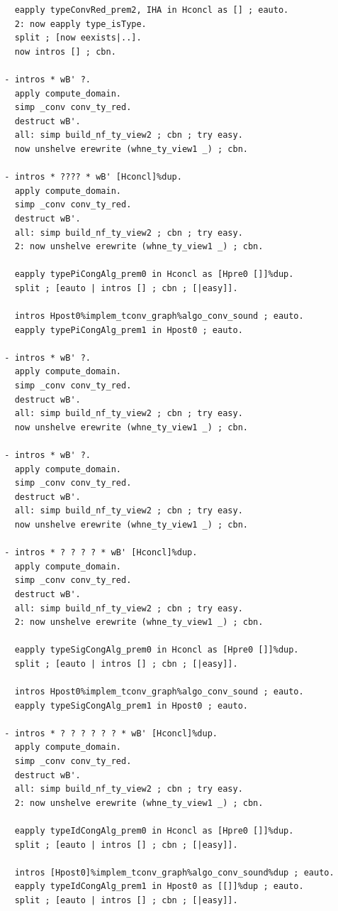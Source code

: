 \documentclass[10pt,a4paper]{amsart}
\begin{document}
\begin{lstlisting}
    eapply typeConvRed_prem2, IHA in Hconcl as [] ; eauto.
    2: now eapply type_isType.
    split ; [now eexists|..].
    now intros [] ; cbn.

  - intros * wB' ?.
    apply compute_domain.
    simp _conv conv_ty_red.
    destruct wB'.
    all: simp build_nf_ty_view2 ; cbn ; try easy.
    now unshelve erewrite (whne_ty_view1 _) ; cbn.

  - intros * ???? * wB' [Hconcl]%dup.
    apply compute_domain.
    simp _conv conv_ty_red.
    destruct wB'.
    all: simp build_nf_ty_view2 ; cbn ; try easy.
    2: now unshelve erewrite (whne_ty_view1 _) ; cbn.
    
    eapply typePiCongAlg_prem0 in Hconcl as [Hpre0 []]%dup.
    split ; [eauto | intros [] ; cbn ; [|easy]].

    intros Hpost0%implem_tconv_graph%algo_conv_sound ; eauto.
    eapply typePiCongAlg_prem1 in Hpost0 ; eauto.

  - intros * wB' ?.
    apply compute_domain.
    simp _conv conv_ty_red.
    destruct wB'.
    all: simp build_nf_ty_view2 ; cbn ; try easy.
    now unshelve erewrite (whne_ty_view1 _) ; cbn.
  
  - intros * wB' ?.
    apply compute_domain.
    simp _conv conv_ty_red.
    destruct wB'.
    all: simp build_nf_ty_view2 ; cbn ; try easy.
    now unshelve erewrite (whne_ty_view1 _) ; cbn.

  - intros * ? ? ? ? * wB' [Hconcl]%dup.
    apply compute_domain.
    simp _conv conv_ty_red.
    destruct wB'.
    all: simp build_nf_ty_view2 ; cbn ; try easy.
    2: now unshelve erewrite (whne_ty_view1 _) ; cbn.
    
    eapply typeSigCongAlg_prem0 in Hconcl as [Hpre0 []]%dup.
    split ; [eauto | intros [] ; cbn ; [|easy]].

    intros Hpost0%implem_tconv_graph%algo_conv_sound ; eauto.
    eapply typeSigCongAlg_prem1 in Hpost0 ; eauto.

  - intros * ? ? ? ? ? ? * wB' [Hconcl]%dup.
    apply compute_domain.
    simp _conv conv_ty_red.
    destruct wB'.
    all: simp build_nf_ty_view2 ; cbn ; try easy.
    2: now unshelve erewrite (whne_ty_view1 _) ; cbn.

    eapply typeIdCongAlg_prem0 in Hconcl as [Hpre0 []]%dup.
    split ; [eauto | intros [] ; cbn ; [|easy]].

    intros [Hpost0]%implem_tconv_graph%algo_conv_sound%dup ; eauto.
    eapply typeIdCongAlg_prem1 in Hpost0 as [[]]%dup ; eauto.
    split ; [eauto | intros [] ; cbn ; [|easy]].


\end{lstlisting}
\end{document}
